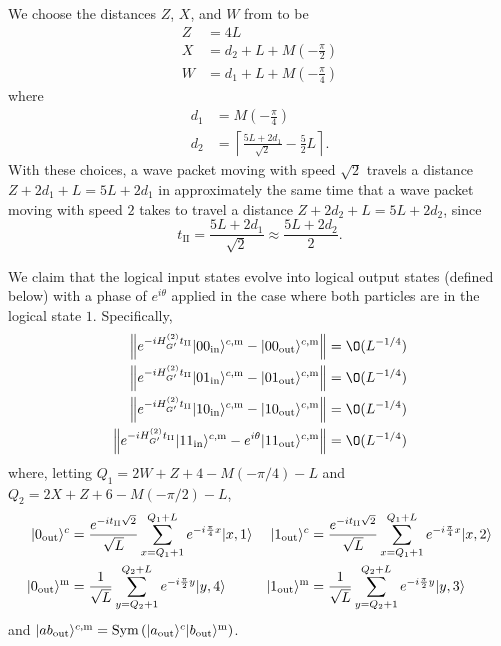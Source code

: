 \documentclass[../thesis-main/thesis-main]{subfiles}
\begin{document}
We choose the distances $Z$, $X$, and $W$ from 
to be \begin{align}
Z & = 4L \label{eq:Z_eq} \\
X & = d_{2}+L+M\left(-\frac{\pi}{2}\right) \label{eq:X_eq}\\
W & = d_{1}+L+M\left(-\frac{\pi}{4}\right) \label{eq:W_eq}
\end{align}
where
\begin{align*}
d_{1} & = M\left(-\frac{\pi}{4}\right) \\
d_{2} & = \left\lceil \frac{5L+2d_{1}}{\sqrt{2}}-\frac{5}{2}L\right\rceil. \end{align*}
With these choices, a wave packet moving with speed $\sqrt{2}$ travels
a distance $Z+2d_{1}+L=5L+2d_{1}$ in approximately the same time that
a wave packet moving with speed $2$ takes to travel a distance $Z+2d_{2}+L=5L+2d_{2}$,
since
\[
t_{\mathrm{II}}=\frac{5L+2d_{1}}{\sqrt{2}}\approx\frac{5L+2d_{2}}{2}.
\]

We claim that the logical input states evolve into logical output states (defined below) with a phase of $e^{i\theta}$ applied in the case where both particles are in the logical state $1$.  Specifically,
\begin{align}
\left\Vert e^{-iH_{G'}^{(2)}t_{\mathrm{II}}}|00_{\text{in}}\rangle^{c,\med}-|00_{\text{out}}\rangle^{c,\med}\right\Vert  & = \O(L^{-{1}/{4}})\label{eq:bound00}\\
\left\Vert e^{-iH_{G'}^{(2)}t_{\mathrm{II}}}|01_{\text{in}}\rangle^{c,\med}-|01_{\text{out}}\rangle^{c,\med}\right\Vert  & = \O(L^{-{1}/{4}})\label{eq:bound01}\\
\left\Vert e^{-iH_{G'}^{(2)}t_{\mathrm{II}}}|10_{\text{in}}\rangle^{c,\med}-|10_{\text{out}}\rangle^{c,\med}\right\Vert  & = \O(L^{-{1}/{4}})\label{eq:bound10}\\
\left\Vert e^{-iH_{G'}^{(2)}t_{\mathrm{II}}}|11_{\text{in}}\rangle^{c,\med} - e^{i\theta}|11_{\text{out}}\rangle^{c,\med}\right\Vert  & = \O(L^{-{1}/{4}})\label{eq:bound11}
\end{align}
 where, letting $Q_{1}=2W+Z+4-M\left(-{\pi}/{4}\right)-L$ and $Q_{2}=2X+Z+6-M\left(-{\pi}/{2}\right)-L$,
\begin{align*}
|0_\text{out}\rangle^c &=\frac{e^{-it_{\mathrm{II}}\sqrt{2}}}{\sqrt{L}}\sum_{x=Q_{1}+1}^{Q_{1}+L}e^{-i\frac{\pi}{4}x}|x,1\rangle &
|1_\text{out}\rangle^c &=\frac{e^{-it_{\mathrm{II}}\sqrt{2}}}{\sqrt{L}}\sum_{x=Q_{1}+1}^{Q_{1}+L}e^{-i\frac{\pi}{4}x}|x,2\rangle \\
|0_\text{out}\rangle^{\mathrm{m}} &=\frac{1}{\sqrt{L}}\sum_{y=Q_{2}+1}^{Q_{2}+L}e^{-i\frac{\pi}{2}y}|y,4\rangle &|1_\text{out}\rangle^{\mathrm{m}} &=\frac{1}{\sqrt{L}}\sum_{y=Q_{2}+1}^{Q_{2}+L}e^{-i\frac{\pi}{2}y}|y,3\rangle
\end{align*}
and $|a b_\text{out}\rangle^{c,\mathrm{m}}=\text{Sym}\left(|a_{\text{out}}\rangle^c|b_{\text{out}}\rangle^{\mathrm{m}}\right)$. 
\end{document}
